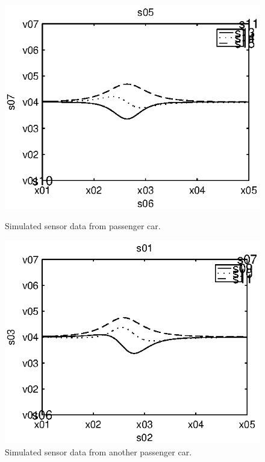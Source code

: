 \begin{subfigures}
\begin{figure}[thb]
 \centering
 \begin{minipage}{0.45\linewidth}
 	\centering
 	
	\includegraphics[width=1\linewidth]{images/passengercar}
  	\caption[Simulated sensor data from passenger car]{Simulated sensor data from passenger car.}
  	\label{fig:simclass1}
 \end{minipage} \hfill
 \begin{minipage}{0.45\linewidth}
 	\centering
 	
  	\includegraphics[width=1\linewidth]{images/passengercar2}
  	\caption[Simulated sensor data from another passenger car]{Simulated sensor data from another passenger car.}
  	\label{fig:simclass2}
 \end{minipage}


\end{figure}
\end{subfigures}

